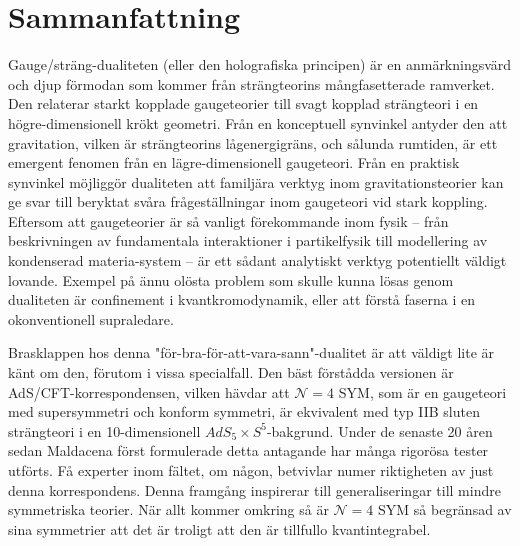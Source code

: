 \chapter{Sammanfattning}



Gauge/str\"ang-dualiteten (eller den holografiska principen) \"ar en anm\"arkningsv\"ard och djup f\"ormodan som kommer fr\r{a}n str\"angteorins m\r{a}ngfasetterade ramverket. Den relaterar starkt kopplade gaugeteorier till svagt kopplad str\"angteori i en h\"ogre-dimensionell kr\"okt geometri. Fr\r{a}n en konceptuell synvinkel antyder den att gravitation, vilken \"ar str\"angteorins l\r{a}genergigr\"ans, och s\r{a}lunda rumtiden, \"ar ett emergent fenomen fr\r{a}n en l\"agre-dimensionell gaugeteori. Fr\r{a}n en praktisk synvinkel m\"ojligg\"or dualiteten att familj\"ara verktyg inom gravitationsteorier kan ge svar till beryktat sv\r{a}ra fr\r{a}gest\"allningar inom gaugeteori vid stark koppling. Eftersom att gaugeteorier \"ar s\r{a} vanligt f\"orekommande inom fysik -- fr\r{a}n beskrivningen av fundamentala interaktioner i partikelfysik till modellering av kondenserad materia-system -- \"ar ett s\r{a}dant analytiskt verktyg potentiellt v\"aldigt lovande. Exempel p\r{a} \"annu ol\"osta problem som skulle kunna l\"osas genom dualiteten \"ar confinement i kvantkromodynamik, eller att f\"orst\r{a} faserna i en okonventionell supraledare.
 
 
Brasklappen hos denna "f\"or-bra-f\"or-att-vara-sann"-dualitet \"ar att v\"aldigt lite \"ar k\"ant om den, f\"orutom i vissa specialfall. Den b\"ast f\"orst\r{a}dda versionen \"ar AdS/CFT-korrespondensen, vilken h\"avdar att $\mathcal{N}=4$ SYM, som \"ar en gaugeteori med supersymmetri och konform symmetri, \"ar ekvivalent med typ IIB sluten str\"angteori i en 10-dimensionell $AdS_5 \times S^5$-bakgrund. Under de senaste 20 \r{a}ren sedan Maldacena f\"orst formulerade detta antagande har m\r{a}nga rigor\"osa tester utf\"orts. F\r{a} experter inom f\"altet, om n\r{a}gon, betvivlar numer riktigheten av just denna korrespondens.  Denna framg\r{a}ng inspirerar till generaliseringar till mindre symmetriska teorier. N\"ar allt kommer omkring s\r{a} \"ar $\mathcal{N}=4$ SYM s\r{a} begr\"ansad av sina symmetrier att det \"ar troligt att den \"ar tillfullo kvantintegrabel.
 
